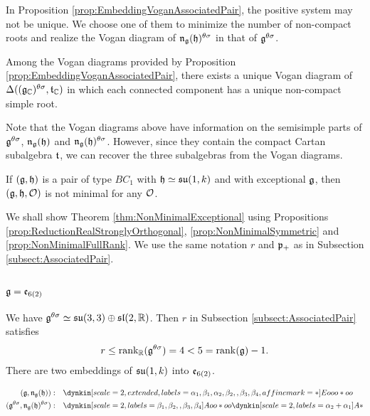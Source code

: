 In Proposition \ref{prop:EmbeddingVoganAssociatedPair}, the positive system may not be unique.
We choose one of them to minimize the number of non-compact roots and realize the Vogan diagram of $\mathfrak{n}_{\mathfrak{g}}(\mathfrak{h})^{\theta\sigma}$ in that of $\mathfrak{g}^{\theta\sigma}$.

\begin{proposition} \label{prop:EmbeddingVoganAssociatedPair2}
	Among the Vogan diagrams provided by Proposition \ref{prop:EmbeddingVoganAssociatedPair}, there exists a unique Vogan diagram of $\Delta((\mathfrak{g}_{\mathbb{C}})^{\theta\sigma}, \mathfrak{t}_{\mathbb{C}})$ in which each connected component has a unique non-compact simple root.
\end{proposition}

Note that the Vogan diagrams above have information on the semisimple parts of $\mathfrak{g}^{\theta\sigma}$, $\mathfrak{n}_{\mathfrak{g}}(\mathfrak{h})$ and $\mathfrak{n}_{\mathfrak{g}}(\mathfrak{h})^{\theta\sigma}$.
However, since they contain the compact Cartan subalgebra $\mathfrak{t}$, we can recover the three subalgebras from the Vogan diagrams.

\begin{theorem} \label{thm:NonMinimalExceptional}
	If $(\mathfrak{g}, \mathfrak{h})$ is a pair of type $BC_1$ with $\mathfrak{h} \simeq \mathfrak{su}(1, k)$ and with exceptional $\mathfrak{g}$, then $(\mathfrak{g}, \mathfrak{h}, \mathcal{O})$ is not minimal for any $\mathcal{O}$.
\end{theorem}

We shall show Theorem \ref{thm:NonMinimalExceptional} using Propositions \ref{prop:ReductionRealStronglyOrthogonal}, \ref{prop:NonMinimalSymmetric} and \ref{prop:NonMinimalFullRank}.
We use the same notation $r$ and $\mathfrak{p}_+$ as in Subsection \ref{subsect:AssociatedPair}.

\subsubsection{\texorpdfstring{$\mathfrak{g} = \mathfrak{e}_{6(2)}$}{g=e6(2)}}


We have $\mathfrak{g}^{\theta\sigma} \simeq \mathfrak{su}(3, 3) \oplus \mathfrak{sl}(2, \mathbb{R})$.
Then $r$ in Subsection \ref{subsect:AssociatedPair} satisfies
\begin{align*}
	r \leq \operatorname{rank}_{\mathbb{R}}(\mathfrak{g}^{\theta\sigma}) = 4 < 5 = \operatorname{rank}(\mathfrak{g}) - 1.
\end{align*}
There are two embeddings of $\mathfrak{su}(1, k)$ into $\mathfrak{e}_{6(2)}$.

\begin{align*}
	(\lie{g}, \lieNorm_{\lie{g}}(\lie{h})): \quad & \dynkin[scale=2, extended, labels={\alpha_1, \beta_1, \alpha_2, \beta_2, , \beta_3, \beta_4}, affine mark=*]{E}{ooo*oo} \\
	(\lie{g}^{\theta\sigma}, \lieNorm_{\lie{g}}(\lie{h})^{\theta\sigma}): \quad & \dynkin[scale=2, labels={\beta_1, \beta_2, , \beta_3, \beta_4}]{A}{oo*oo} \dynkin[scale=2, labels={\alpha_2 + \alpha_1}]{A}{*}
\end{align*}

